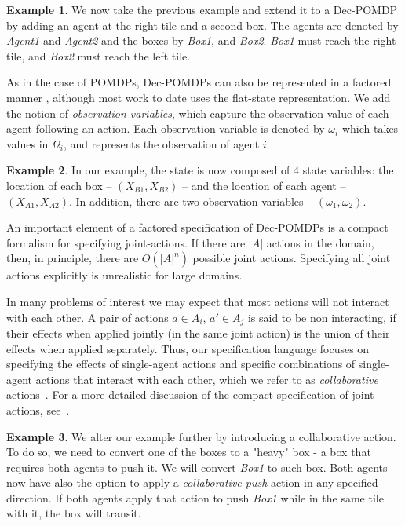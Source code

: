 \documentclass[letterpaper]{article} %
\theoremstyle{definition}
\newtheorem{example}{Example}
\begin{document}
\begin{example}
We now take the previous example and extend it to a Dec-POMDP by adding an agent at the right tile and a second box. The agents are denoted by \emph{Agent1} and \emph{Agent2} and the boxes by \emph{Box1}, and \emph{Box2}. \emph{Box1} must reach the right tile, and \emph{Box2} must reach the left tile.
\end{example}

As in the case of POMDPs, Dec-POMDPs can also be represented in a factored manner \cite{FDECPOMDP}, although most work to date uses the flat-state representation.
We add the notion of \emph{observation variables}, which capture the observation value of each agent following an action. Each observation variable is denoted by $\omega_i$ which takes values in $\Omega_i$, and represents the observation of agent $i$.

\begin{example}
In our example, the state is now composed of 4 state variables: the location of each box -- $(X_{B1}, X_{B2})$ -- and the location of each agent -- $(X_{A1}, X_{A2})$. In addition, there are two observation variables -- $(\omega_1, \omega_2)$.
\end{example}

An important element of a factored specification of Dec-POMDPs is a compact formalism for specifying joint-actions. If there are $|A|$ actions in the domain, then, in principle, there are $O(|A|^n)$ possible joint actions. Specifying all joint actions explicitly is unrealistic for large domains. 

In many problems of interest we may expect
that most actions will not interact with each other. A pair of actions $a\in A_i$, $a' \in A_j$ is said to be non interacting, if their effects when applied jointly (in the same joint action) is the union of their effects when applied separately.
Thus, our specification language focuses on specifying
the effects of single-agent actions and specific
combinations of single-agent actions that interact with each other, which we refer to as {\em collaborative} actions~\cite{IMAP}.
For a more detailed discussion of the compact specification of joint-actions, see~\cite{QDECPOMDPPLAN2}. 

\begin{example}
We alter our example further by introducing a collaborative action. To do so, we need to convert one of the boxes to a "heavy" box - a box that requires both agents to push it. We will convert \emph{Box1} to such box. Both agents now have also the option to apply a \emph{collaborative-push} action in any specified direction. If both agents apply that action to push \emph{Box1} while in the same tile with it, the box will transit.
\end{example}
\end{document}

